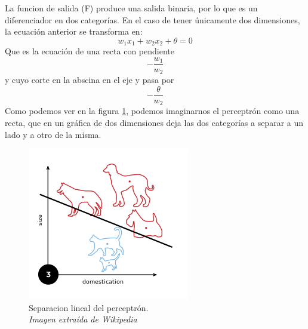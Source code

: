 La funcion de salida (F) produce una salida binaria, por lo que es un diferenciador en dos categorías. En el caso de tener únicamente dos dimensiones, la ecuación anterior se transforma en:
\begin{equation}
w_{1}x_{1} + w_{2}x_{2} + \theta = 0
\end{equation}
Que es la ecuación de una recta con pendiente \begin{equation}-\frac{w_{1}}{w_{2}}\end{equation} y cuyo corte en la abscina en el eje y pasa por \begin{equation}-\frac{\theta}{w_{2}}\end{equation}
Como podemos ver en la figura \ref{perceptron_recta}, podemos imaginarnos el perceptrón como una recta, que en un gráfica de dos dimensiones deja las dos categorías a separar a un lado y a otro de la misma.
\begin{figure}[htp]
\centering
\includegraphics[scale=0.5]{images/Perceptron_example.png}
\caption{Separacion lineal del perceptrón.\\\textit{Imagen extraída de Wikipedia}}
\label{perceptron_recta}
\end{figure}
